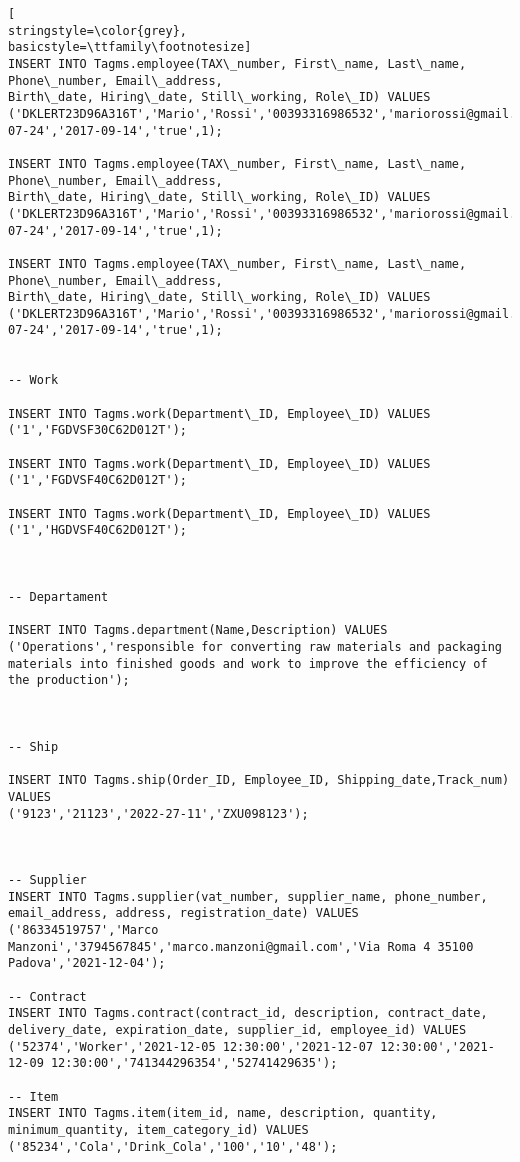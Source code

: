 \begin{lstlisting}[
stringstyle=\color{grey},
basicstyle=\ttfamily\footnotesize]
INSERT INTO Tagms.employee(TAX\_number, First\_name, Last\_name, Phone\_number, Email\_address,
Birth\_date, Hiring\_date, Still\_working, Role\_ID) VALUES
('DKLERT23D96A316T','Mario','Rossi','00393316986532','mariorossi@gmail.com','1953-07-24','2017-09-14','true',1);

INSERT INTO Tagms.employee(TAX\_number, First\_name, Last\_name, Phone\_number, Email\_address,
Birth\_date, Hiring\_date, Still\_working, Role\_ID) VALUES
('DKLERT23D96A316T','Mario','Rossi','00393316986532','mariorossi@gmail.com','1953-07-24','2017-09-14','true',1);

INSERT INTO Tagms.employee(TAX\_number, First\_name, Last\_name, Phone\_number, Email\_address,
Birth\_date, Hiring\_date, Still\_working, Role\_ID) VALUES
('DKLERT23D96A316T','Mario','Rossi','00393316986532','mariorossi@gmail.com','1953-07-24','2017-09-14','true',1);


-- Work

INSERT INTO Tagms.work(Department\_ID, Employee\_ID) VALUES 
('1','FGDVSF30C62D012T');

INSERT INTO Tagms.work(Department\_ID, Employee\_ID) VALUES 
('1','FGDVSF40C62D012T');

INSERT INTO Tagms.work(Department\_ID, Employee\_ID) VALUES 
('1','HGDVSF40C62D012T');



-- Departament

INSERT INTO Tagms.department(Name,Description) VALUES
('Operations','responsible for converting raw materials and packaging materials into finished goods and work to improve the efficiency of the production');



-- Ship

INSERT INTO Tagms.ship(Order_ID, Employee_ID, Shipping_date,Track_num) VALUES 
('9123','21123','2022-27-11','ZXU098123');



-- Supplier
INSERT INTO Tagms.supplier(vat_number, supplier_name, phone_number, email_address, address, registration_date) VALUES
('86334519757','Marco Manzoni','3794567845','marco.manzoni@gmail.com','Via Roma 4 35100 Padova','2021-12-04');

-- Contract
INSERT INTO Tagms.contract(contract_id, description, contract_date, delivery_date, expiration_date, supplier_id, employee_id) VALUES 
('52374','Worker','2021-12-05 12:30:00','2021-12-07 12:30:00','2021-12-09 12:30:00','741344296354','52741429635');

-- Item
INSERT INTO Tagms.item(item_id, name, description, quantity, minimum_quantity, item_category_id) VALUES 
('85234','Cola','Drink_Cola','100','10','48');


\end{lstlisting}
